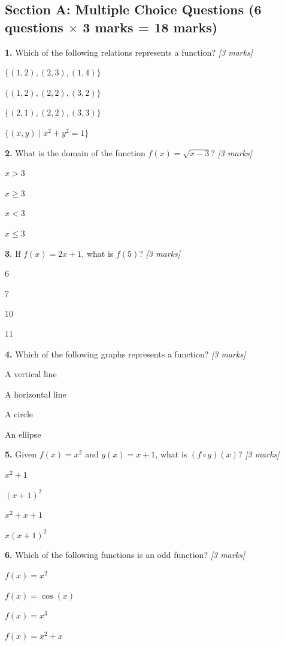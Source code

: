 \documentclass[12pt,a4paper]{article}
\begin{document}
\subsection*{Section A: Multiple Choice Questions \normalfont\small (6 questions \(\times\) 3 marks = 18 marks)}
\vspace{4pt}
\noindent\textbf{1.} Which of the following relations represents a function? \hfill\textit{[3 marks]}
\begin{mcqlist}
  \item $\{(1,2), (2,3), (1,4)\}$
  \item $\{(1,2), (2,2), (3,2)\}$
  \item $\{(2,1), (2,2), (3,3)\}$
  \item $\{(x,y) \mid x^2 + y^2 = 1\}$
\end{mcqlist}
\vspace{6pt}
\noindent\textbf{2.} What is the domain of the function $f(x) = \sqrt{x-3}$? \hfill\textit{[3 marks]}
\begin{mcqlist}
  \item $x > 3$
  \item $x \ge 3$
  \item $x < 3$
  \item $x \le 3$
\end{mcqlist}
\vspace{6pt}
\noindent\textbf{3.} If $f(x) = 2x + 1$, what is $f(5)$? \hfill\textit{[3 marks]}
\begin{mcqlist}
  \item 6
  \item 7
  \item 10
  \item 11
\end{mcqlist}
\vspace{6pt}
\noindent\textbf{4.} Which of the following graphs represents a function? \hfill\textit{[3 marks]}
\begin{mcqlist}
  \item A vertical line
  \item A horizontal line
  \item A circle
  \item An ellipse
\end{mcqlist}
\vspace{6pt}
\noindent\textbf{5.} Given $f(x) = x^2$ and $g(x) = x+1$, what is $(f \circ g)(x)$? \hfill\textit{[3 marks]}
\begin{mcqlist}
  \item $x^2 + 1$
  \item $(x+1)^2$
  \item $x^2 + x + 1$
  \item $x(x+1)^2$
\end{mcqlist}
\vspace{6pt}
\noindent\textbf{6.} Which of the following functions is an odd function? \hfill\textit{[3 marks]}
\begin{mcqlist}
  \item $f(x) = x^2$
  \item $f(x) = \cos(x)$
  \item $f(x) = x^3$
  \item $f(x) = x^2 + x$
\end{mcqlist}
\vspace{6pt}
\end{document}
